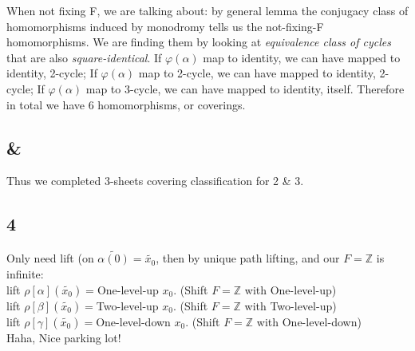 \documentclass[11pt]{article}
\def\Z{{\mathbb Z}}
\theoremstyle{remark}
\begin{document}
    When not fixing F, we are talking about: by general lemma the conjugacy class of homomorphisms induced by monodromy tells us the not-fixing-F homomorphisms. We are finding them by looking at \textit{equivalence class of cycles} that are also \textit{square-identical}. If $\varphi(\alpha)$ map to identity, we can have mapped to identity, 2-cycle; If $\varphi(\alpha)$ map to 2-cycle, we can have mapped to identity, 2-cycle; If $\varphi(\alpha)$ map to 3-cycle, we can have mapped to identity, itself. Therefore in total we have 6 homomorphisms, or coverings. 
    
    
\subsection*{ & }     
    Thus we completed 3-sheets covering classification for 2 & 3.
\subsection*{4}
    Only need lift (on $\tilde{\alpha(0)}=\tilde{x_0}$, then by unique path lifting, and our $F=\Z$ is infinite: 
    \\lift $\rho{[\alpha]}(\tilde{x_0})=$One-level-up $x_0$. (Shift $F=\Z$ with One-level-up) 
    \\lift $\rho{[\beta]}(\tilde{x_0})=$Two-level-up $x_0$. (Shift $F=\Z$ with Two-level-up) 
    \\lift $\rho{[\gamma]}(\tilde{x_0})=$One-level-down $x_0$. (Shift $F=\Z$  with One-level-down) \\Haha, Nice parking lot! 
\end{document}

